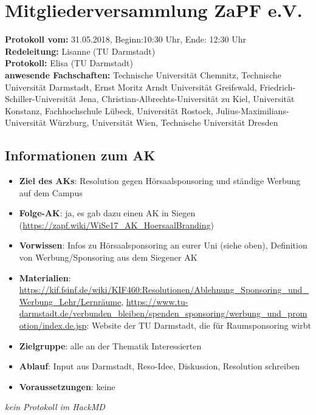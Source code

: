 
\section{Mitgliederversammlung ZaPF e.V.}

	\textbf{Protokoll vom:} 31.05.2018,
	Beginn:10:30 Uhr,
	Ende: 12:30 Uhr \\
	\textbf{Redeleitung:} Lisanne (TU Darmstadt) \\
	\textbf{Protokoll:} Elisa (TU Darmstadt) \\
	\textbf{anwesende Fachschaften:} Technische Universität Chemnitz, Technische Universität Darmstadt, Ernst Moritz Arndt Universität Greifswald, Friedrich-Schiller-Universität Jena, Christian-Albrechts-Universität zu Kiel, Universität Konstanz, Fachhochschule Lübeck, Universität Rostock, Julius-Maximilians-Universität Würzburg, Universität Wien, Technische Universität Dresden

	\subsection*{Informationen zum AK}
		\begin{itemize}
			\item \textbf{Ziel des AKs}: Resolution gegen Hörsaalsponsoring und ständige Werbung auf dem Campus
			\item \textbf{Folge-AK}:  ja, es gab dazu einen AK in Siegen (\url{https://zapf.wiki/WiSe17_AK_HoersaalBranding})
			\item \textbf{Vorwissen}: Infos zu Hörsaalsponsoring an eurer Uni (siehe oben), Definition von Werbung/Sponsoring aus dem Siegener AK
      \item \textbf{Materialien}: \url{https://kif.fsinf.de/wiki/KIF460:Resolutionen/Ablehnung_Sponsoring_und_Werbung_Lehr/Lernräume}, \url{https://www.tu-darmstadt.de/verbunden_bleiben/spenden_sponsoring/werbung_und_promotion/index.de.jsp}: Website der TU Darmstadt, die für Raumsponsoring wirbt
			\item \textbf{Zielgruppe}: alle an der Thematik Interessierten
			\item \textbf{Ablauf}: Input aus Darmstadt, Reso-Idee, Diskussion, Resolution schreiben
			\item \textbf{Voraussetzungen}: keine
		\end{itemize}

\textit{kein Protokoll im HackMD}
